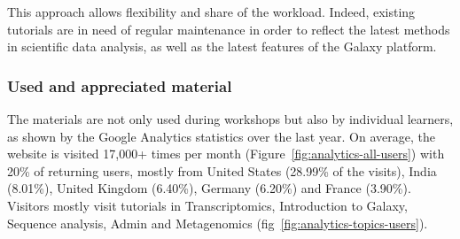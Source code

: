 \documentclass[10pt,letterpaper]{article}
\begin{document}
This approach allows flexibility and share of the workload. Indeed, existing tutorials are in need of regular maintenance in order to reflect the latest methods in scientific data analysis, as well as the latest features of the Galaxy platform.

\subsubsection*{Used and appreciated material}

The materials are not only used during workshops but also by individual learners, as shown by the Google Analytics statistics over the last year.
On average, the website is visited 17,000+ times per month (Figure~\ref{fig:analytics-all-users}) with 20\% of returning users, mostly from United States (28.99\% of the visits), India (8.01\%), United Kingdom (6.40\%), Germany (6.20\%) and France (3.90\%). Visitors mostly visit tutorials in Transcriptomics, Introduction to Galaxy, Sequence analysis, Admin and Metagenomics (fig~\ref{fig:analytics-topics-users}).
\end{document}
